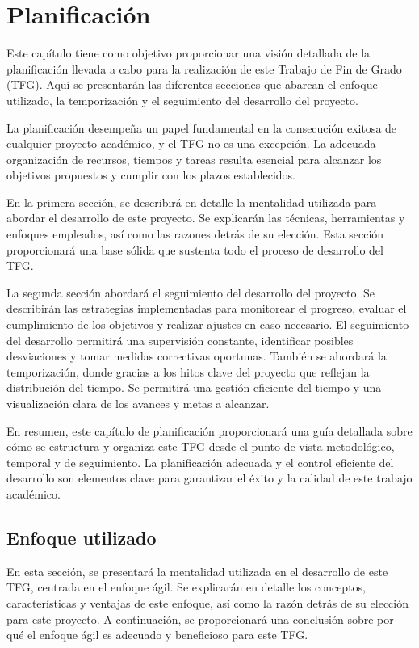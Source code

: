 \chapter{Planificación}

Este capítulo tiene como objetivo proporcionar una visión detallada de la planificación llevada a cabo para la realización de este Trabajo de Fin de Grado (TFG). Aquí se presentarán las diferentes secciones que abarcan el enfoque utilizado, la temporización y el seguimiento del desarrollo del proyecto.

La planificación desempeña un papel fundamental en la consecución exitosa de cualquier proyecto académico, y el TFG no es una excepción. La adecuada organización de recursos, tiempos y tareas resulta esencial para alcanzar los objetivos propuestos y cumplir con los plazos establecidos.

En la primera sección, se describirá en detalle la mentalidad utilizada para abordar el desarrollo de este proyecto. Se explicarán las técnicas, herramientas y enfoques empleados, así como las razones detrás de su elección. Esta sección proporcionará una base sólida que sustenta todo el proceso de desarrollo del TFG.

La segunda sección abordará el seguimiento del desarrollo del proyecto. Se describirán las estrategias implementadas para monitorear el progreso, evaluar el cumplimiento de los objetivos y realizar ajustes en caso necesario. El seguimiento del desarrollo permitirá una supervisión constante, identificar posibles desviaciones y tomar medidas correctivas oportunas. También se abordará la temporización, donde gracias a los hitos clave del proyecto que reflejan la distribución del tiempo. Se permitirá una gestión eficiente del tiempo y una visualización clara de los avances y metas a alcanzar.

En resumen, este capítulo de planificación proporcionará una guía detallada sobre cómo se estructura y organiza este TFG desde el punto de vista metodológico, temporal y de seguimiento. La planificación adecuada y el control eficiente del desarrollo son elementos clave para garantizar el éxito y la calidad de este trabajo académico.

\section{Enfoque utilizado}

En esta sección, se presentará la mentalidad utilizada en el desarrollo de este TFG, centrada en el enfoque ágil. Se explicarán en detalle los conceptos, características y ventajas de este enfoque, así como la razón detrás de su elección para este proyecto. A continuación, se proporcionará una conclusión sobre por qué el enfoque ágil es adecuado y beneficioso para este TFG.


